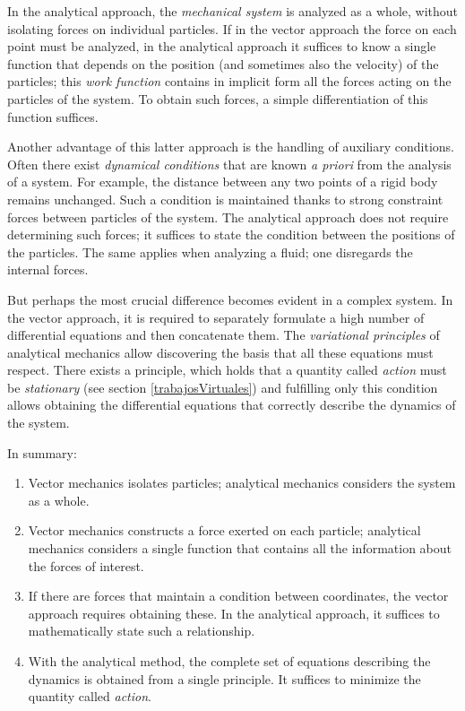 \documentclass[12pt, spanish, a4paper, ]{article}
\begin{document}
In the analytical approach, the \emph{mechanical system} is analyzed as a whole, without isolating forces on individual particles.
If in the vector approach the force on each point must be analyzed, in the analytical approach it suffices to know a single function that depends on the position (and sometimes also the velocity) of the particles; this \emph{work function} contains in implicit form all the forces acting on the particles of the system.
To obtain such forces, a simple differentiation of this function suffices.

Another advantage of this latter approach is the handling of auxiliary conditions.
Often there exist \emph{dynamical conditions} that are known \emph{a priori} from the analysis of a system.
For example, the distance between any two points of a rigid body remains unchanged.
Such a condition is maintained thanks to strong constraint forces between particles of the system.
The analytical approach does not require determining such forces; it suffices to state the condition between the positions of the particles.
The same applies when analyzing a fluid; one disregards the internal forces.

But perhaps the most crucial difference becomes evident in a complex system.
In the vector approach, it is required to separately formulate a high number of differential equations and then concatenate them.
The \emph{variational principles} of analytical mechanics allow discovering the basis that all these equations must respect.
There exists a principle, which holds that a quantity called \emph{action} must be \emph{stationary} (see section \ref{trabajosVirtuales}) and fulfilling only this condition allows obtaining the differential equations that correctly describe the dynamics of the system.

In summary:
\begin{enumerate}
	\item Vector mechanics isolates particles; analytical mechanics considers the system as a whole.
	\item Vector mechanics constructs a force exerted on each particle; analytical mechanics considers a single function that contains all the information about the forces of interest.
	\item If there are forces that maintain a condition between coordinates, the vector approach requires obtaining these. In the analytical approach, it suffices to mathematically state such a relationship.
	\item With the analytical method, the complete set of equations describing the dynamics is obtained from a single principle. It suffices to minimize the quantity called \emph{action}.
\end{enumerate}
\end{document}
